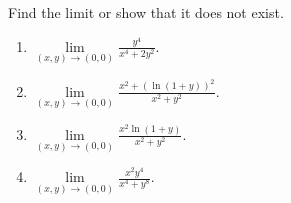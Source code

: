 Find the limit or show that it does not exist.

\begin{enumerate}
\item $\displaystyle \lim\limits_{(x,y)\to (0,0)}\frac{ y^4}{x^4+2y^2}$.


\item $\displaystyle \lim\limits_{(x,y)\to (0,0)} \frac{x^2+\left(\ln (1+y)\right)^2}{x^2+y^2}$.


\item $\displaystyle \lim\limits_{(x,y)\to (0,0)} \frac{x^2\ln (1+y)}{x^2+y^2}$.


\item $\displaystyle \lim\limits_{(x,y)\to (0,0)} \frac{x^2y^4}{x^4+y^8} .$


\end{enumerate}